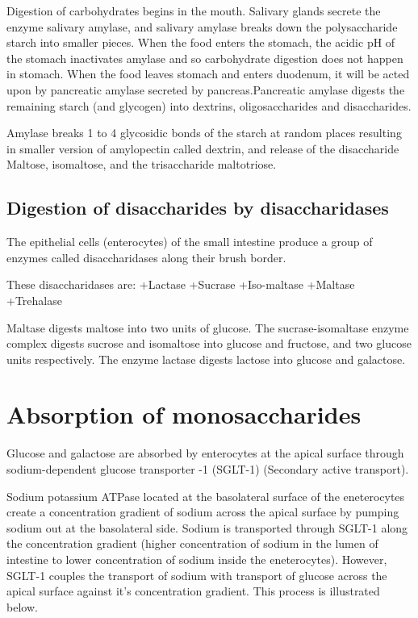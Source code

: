 \documentclass[
]{book}
\begin{document}
Digestion of carbohydrates begins in the mouth. Salivary glands secrete the enzyme salivary amylase, and salivary amylase breaks down the polysaccharide starch into smaller pieces. When the food enters the stomach, the acidic pH of the stomach inactivates amylase and so carbohydrate digestion does not happen in stomach. When the food leaves stomach and enters duodenum, it will be acted upon by pancreatic amylase secreted by pancreas.Pancreatic amylase digests the remaining starch (and glycogen) into dextrins, oligosaccharides and disaccharides.

Amylase breaks 1 to 4 glycosidic bonds of the starch at random places resulting in smaller version of amylopectin called dextrin, and release of the disaccharide Maltose, isomaltose, and the trisaccharide maltotriose.

\subsection{Digestion of disaccharides by disaccharidases}\label{digestion-of-disaccharides-by-disaccharidases}

The epithelial cells (enterocytes) of the small intestine produce a group of enzymes called disaccharidases along their brush border.

These disaccharidases are:
+Lactase
+Sucrase
+Iso-maltase
+Maltase
+Trehalase

Maltase digests maltose into two units of glucose. The sucrase-isomaltase enzyme complex digests sucrose and isomaltose into glucose and fructose, and two glucose units respectively. The enzyme lactase digests lactose into glucose and galactose.

\section{Absorption of monosaccharides}\label{absorption-of-monosaccharides}

Glucose and galactose are absorbed by enterocytes at the apical surface through sodium-dependent glucose transporter -1 (SGLT-1) (Secondary active transport).

Sodium potassium ATPase located at the basolateral surface of the eneterocytes create a concentration gradient of sodium across the apical surface by pumping sodium out at the basolateral side. Sodium is transported through SGLT-1 along the concentration gradient (higher concentration of sodium in the lumen of intestine to lower concentration of sodium inside the eneterocytes). However, SGLT-1 couples the transport of sodium with transport of glucose across the apical surface against it's concentration gradient. This process is illustrated below.
\end{document}
